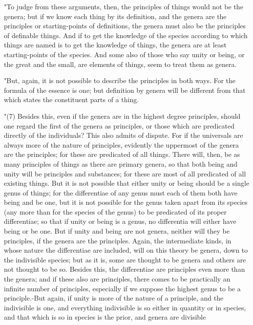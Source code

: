 "To judge from these arguments, then, the principles of things would
not be the genera; but if we know each thing by its definition, and
the genera are the principles or starting-points of definitions, the
genera must also be the principles of definable things. And if to
get the knowledge of the species according to which things are named
is to get the knowledge of things, the genera are at least starting-points
of the species. And some also of those who say unity or being, or
the great and the small, are elements of things, seem to treat them
as genera. 

"But, again, it is not possible to describe the principles in both
ways. For the formula of the essence is one; but definition by genera
will be different from that which states the constituent parts of
a thing. 

"(7) Besides this, even if the genera are in the highest degree principles,
should one regard the first of the genera as principles, or those
which are predicated directly of the individuals? This also admits
of dispute. For if the universals are always more of the nature of
principles, evidently the uppermost of the genera are the principles;
for these are predicated of all things. There will, then, be as many
principles of things as there are primary genera, so that both being
and unity will be principles and substances; for these are most of
all predicated of all existing things. But it is not possible that
either unity or being should be a single genus of things; for the
differentiae of any genus must each of them both have being and be
one, but it is not possible for the genus taken apart from its species
(any more than for the species of the genus) to be predicated of its
proper differentiae; so that if unity or being is a genus, no differentia
will either have being or be one. But if unity and being are not genera,
neither will they be principles, if the genera are the principles.
Again, the intermediate kinds, in whose nature the differentiae are
included, will on this theory be genera, down to the indivisible species;
but as it is, some are thought to be genera and others are not thought
to be so. Besides this, the differentiae are principles even more
than the genera; and if these also are principles, there comes to
be practically an infinite number of principles, especially if we
suppose the highest genus to be a principle.-But again, if unity is
more of the nature of a principle, and the indivisible is one, and
everything indivisible is so either in quantity or in species, and
that which is so in species is the prior, and genera are divisible
